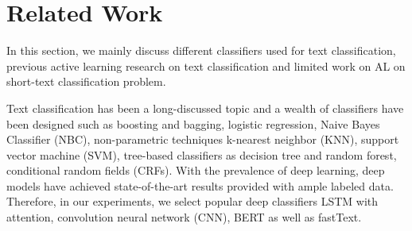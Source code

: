 \section{Related Work}
\label{sec:related}






In this section, we mainly discuss different classifiers used for text classification,  previous active learning research on text classification and limited work on AL on short-text classification problem. 

Text classification has been a long-discussed topic and a wealth of classifiers have been designed such as boosting and bagging, logistic regression, Naive Bayes Classifier (NBC), non-parametric techniques k-nearest neighbor (KNN), support vector machine (SVM), tree-based classifiers as decision tree and random forest, conditional random fields (CRFs). With the prevalence of deep learning, deep models have achieved state-of-the-art results provided with ample labeled data. Therefore, in our experiments, we select popular deep classifiers LSTM with attention, convolution neural network (CNN), BERT as well as fastText.


